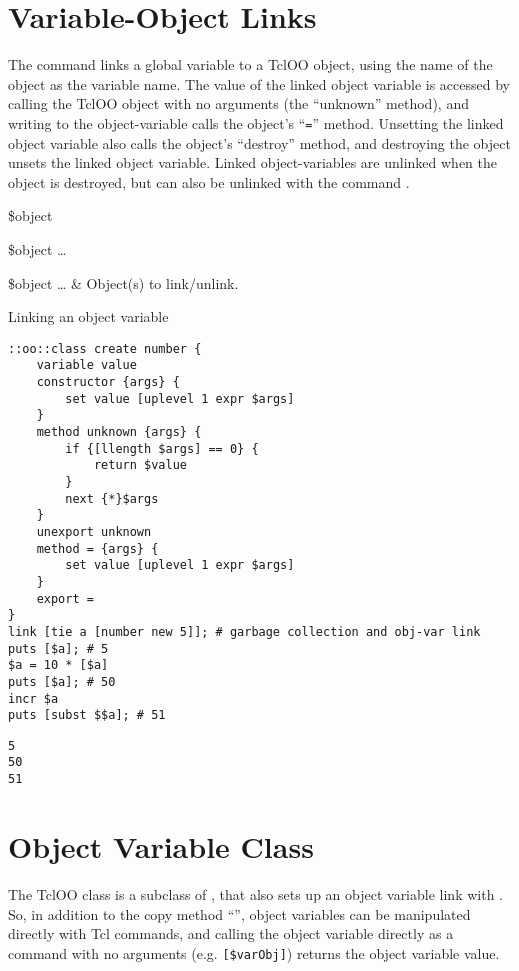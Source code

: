 \documentclass{article}
\begin{document}
\section{Variable-Object Links}
The command  links a global variable to a TclOO object, using the name of the object as the variable name. 
The value of the linked object variable is accessed by calling the TclOO object with no arguments (the ``unknown'' method), and writing to the object-variable calls the object's ``\texttt{=}'' method. 
Unsetting the linked object variable also calls the object's ``destroy'' method, and destroying the object unsets the linked object variable.
Linked object-variables are unlinked when the object is destroyed, but can also be unlinked with the command .
\begin{syntax}
 \$object
\end{syntax}
\begin{syntax}
 \$object …
\end{syntax}
\begin{args}
\$object … & Object(s) to link/unlink.
\end{args}
\begin{example}{Linking an object variable}
\begin{lstlisting}
::oo::class create number {
    variable value
    constructor {args} {
        set value [uplevel 1 expr $args]
    }
    method unknown {args} {
        if {[llength $args] == 0} {
            return $value
        }
        next {*}$args
    }
    unexport unknown
    method = {args} {
        set value [uplevel 1 expr $args]
    }
    export =
}
link [tie a [number new 5]]; # garbage collection and obj-var link
puts [$a]; # 5
$a = 10 * [$a]
puts [$a]; # 50
incr $a
puts [subst $$a]; # 51
\end{lstlisting}
\tcblower
\begin{lstlisting}
5
50
51
\end{lstlisting}
\end{example}
\clearpage
\section{Object Variable Class}
The TclOO class  is a subclass of , that also sets up an object variable link with . 
So, in addition to the copy method ``\texttt{}'', object variables can be manipulated directly with Tcl commands, and calling the object variable directly as a command with no arguments (e.g. \texttt{[\$varObj]}) returns the object variable value.
\end{document}
